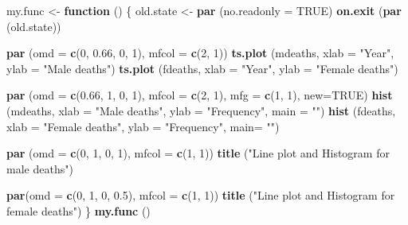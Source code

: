 \documentclass[
]{book}
\newenvironment{Shaded}{\begin{snugshade}}{\end{snugshade}}
\newcommand{\AttributeTok}[1]{\textcolor[rgb]{0.13,0.29,0.53}{#1}}
\newcommand{\ConstantTok}[1]{\textcolor[rgb]{0.56,0.35,0.01}{#1}}
\newcommand{\ControlFlowTok}[1]{\textcolor[rgb]{0.13,0.29,0.53}{\textbf{#1}}}
\newcommand{\DecValTok}[1]{\textcolor[rgb]{0.00,0.00,0.81}{#1}}
\newcommand{\FloatTok}[1]{\textcolor[rgb]{0.00,0.00,0.81}{#1}}
\newcommand{\FunctionTok}[1]{\textcolor[rgb]{0.13,0.29,0.53}{\textbf{#1}}}
\newcommand{\NormalTok}[1]{#1}
\newcommand{\OtherTok}[1]{\textcolor[rgb]{0.56,0.35,0.01}{#1}}
\newcommand{\StringTok}[1]{\textcolor[rgb]{0.31,0.60,0.02}{#1}}
\begin{document}
\begin{Shaded}
\begin{Highlighting}[]
\NormalTok{my.func }\OtherTok{\textless{}{-}} \ControlFlowTok{function}\NormalTok{ () }
\NormalTok{\{ old.state }\OtherTok{\textless{}{-}} \FunctionTok{par}\NormalTok{ (}\AttributeTok{no.readonly =} \ConstantTok{TRUE}\NormalTok{)}
 \FunctionTok{on.exit}\NormalTok{ (}\FunctionTok{par}\NormalTok{ (old.state))}
   
 \FunctionTok{par}\NormalTok{ (}\AttributeTok{omd =} \FunctionTok{c}\NormalTok{(}\DecValTok{0}\NormalTok{, }\FloatTok{0.66}\NormalTok{, }\DecValTok{0}\NormalTok{, }\DecValTok{1}\NormalTok{), }\AttributeTok{mfcol =} \FunctionTok{c}\NormalTok{(}\DecValTok{2}\NormalTok{, }\DecValTok{1}\NormalTok{))}
 \FunctionTok{ts.plot}\NormalTok{ (mdeaths, }\AttributeTok{xlab =} \StringTok{"Year"}\NormalTok{, }\AttributeTok{ylab =} \StringTok{"Male deaths"}\NormalTok{)}
 \FunctionTok{ts.plot}\NormalTok{ (fdeaths, }\AttributeTok{xlab =} \StringTok{"Year"}\NormalTok{, }\AttributeTok{ylab =} \StringTok{"Female deaths"}\NormalTok{)}

 \FunctionTok{par}\NormalTok{ (}\AttributeTok{omd =} \FunctionTok{c}\NormalTok{(}\FloatTok{0.66}\NormalTok{, }\DecValTok{1}\NormalTok{, }\DecValTok{0}\NormalTok{, }\DecValTok{1}\NormalTok{), }\AttributeTok{mfcol =} \FunctionTok{c}\NormalTok{(}\DecValTok{2}\NormalTok{, }\DecValTok{1}\NormalTok{), }\AttributeTok{mfg =} \FunctionTok{c}\NormalTok{(}\DecValTok{1}\NormalTok{, }\DecValTok{1}\NormalTok{), }\AttributeTok{new=}\ConstantTok{TRUE}\NormalTok{)}
 \FunctionTok{hist}\NormalTok{ (mdeaths, }\AttributeTok{xlab =} \StringTok{"Male deaths"}\NormalTok{, }\AttributeTok{ylab =} \StringTok{"Frequency"}\NormalTok{, }\AttributeTok{main =} \StringTok{""}\NormalTok{)}
 \FunctionTok{hist}\NormalTok{ (fdeaths, }\AttributeTok{xlab =} \StringTok{"Female deaths"}\NormalTok{, }\AttributeTok{ylab =} \StringTok{"Frequency"}\NormalTok{, }\AttributeTok{main=} \StringTok{""}\NormalTok{)}

 \FunctionTok{par}\NormalTok{ (}\AttributeTok{omd =} \FunctionTok{c}\NormalTok{(}\DecValTok{0}\NormalTok{, }\DecValTok{1}\NormalTok{, }\DecValTok{0}\NormalTok{, }\DecValTok{1}\NormalTok{), }\AttributeTok{mfcol =} \FunctionTok{c}\NormalTok{(}\DecValTok{1}\NormalTok{, }\DecValTok{1}\NormalTok{))}
 \FunctionTok{title}\NormalTok{ (}\StringTok{"Line plot and Histogram for male deaths"}\NormalTok{)}
   
 \FunctionTok{par}\NormalTok{(}\AttributeTok{omd =} \FunctionTok{c}\NormalTok{(}\DecValTok{0}\NormalTok{, }\DecValTok{1}\NormalTok{, }\DecValTok{0}\NormalTok{, }\FloatTok{0.5}\NormalTok{), }\AttributeTok{mfcol =} \FunctionTok{c}\NormalTok{(}\DecValTok{1}\NormalTok{, }\DecValTok{1}\NormalTok{))}
 \FunctionTok{title}\NormalTok{ (}\StringTok{"Line plot and Histogram for female deaths"}\NormalTok{)          }
\NormalTok{\}}
\FunctionTok{my.func}\NormalTok{ ()}
\end{Highlighting}
\end{Shaded}
\end{document}
